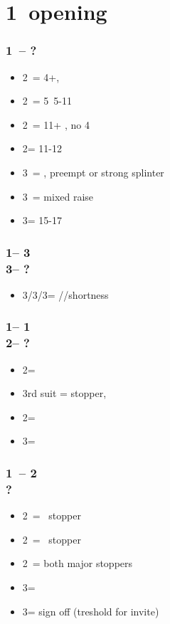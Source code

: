 \documentclass[12pt, a4paper]{report}
\begin{document}
\section*{\colorbox{blue!30}{1\diams\ opening}}
 {

    \subsubsection*{1\diams\ -- ?}
    \begin{itemize}
        \item 2\diams\ = 4+\diams, \invp
        \item 2\hearts\ = 5\hearts\ 5-11
        \item 2\spades\ = 11+ \bal, no 4\major
        \item 2\nt = 11-12 \bal
        \item 3\clubs\ = \diams, preempt or strong splinter
        \item 3\diams\ = mixed raise
        \item 3\nt = 15-17 \bal
    \end{itemize}

    \subsubsection*{1\diams -- 3\clubs\\
                    3\diams -- ?}
    \begin{itemize}
        \item 3\hearts/3\spades/3\nt = \hearts/\spades/\clubs shortness
    \end{itemize}

    \subsubsection*{1\diams -- 1\major\\
                    2\diams -- ?}
    \begin{itemize}
        \item 2\major = \nf
        \item 3rd suit = stopper, \gf
        \item 2\nt = \gf
        \item 3\diams = \inv
    \end{itemize}

    \subsubsection*{1\diams\ -- 2\diams \\ ?}
    \begin{itemize}
        \item 2\hearts\ = \hearts\ stopper
        \item 2\spades\ = \spades\ stopper
        \item 2\nt\ = both major stoppers
        \item 3\clubs = \nat
        \item 3\diams = sign off (treshold for invite)
    \end{itemize}

}
\end{document}
